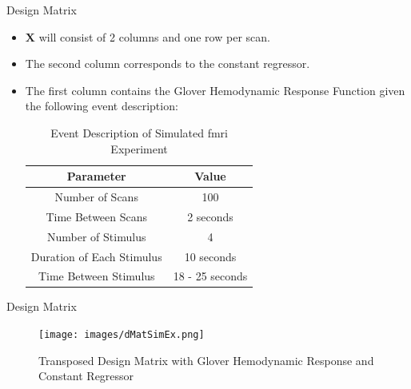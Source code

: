 \documentclass{beamer}
\begin{document}

\begin{frame}{Design Matrix}
\begin{itemize}
\item $\bm{X}$ will consist of 2 columns and one row per scan.
\item The second column corresponds to the constant regressor.
\item The first column contains the Glover Hemodynamic Response Function
 given the following event description:

\begin{table}
\centering
\caption{Event Description of Simulated \gls{fmri} Experiment}
\begin{tabular}{cc}
\hline
\textbf{Parameter} & \textbf{Value} \\ \hline
Number of Scans & 100 \\
Time Between Scans & 2 seconds \\
Number of Stimulus & 4 \\
Duration of Each Stimulus & 10 seconds \\
Time Between Stimulus & 18 - 25 seconds \\ \hline
\end{tabular}
\end{table}
\end{itemize}
\end{frame}

\begin{frame}{Design Matrix}

\begin{figure}
\centering
\texttt{[image: images/dMatSimEx.png]}
\caption{Transposed Design Matrix with Glover Hemodynamic Response and Constant Regressor}
\end{figure}
\end{frame}

\end{document}
